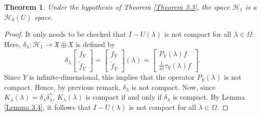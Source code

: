 \documentclass [12pt,reqno]{amsart}
\numberwithin{equation}{subsection}
\newtheorem{thm}{Theorem}[section]
\numberwithin{equation}{section}
\begin{document}
\begin{thm}\label{Theorem 3.6}
Under the hypothesis of Theorem \ref{Theorem 3.3}, the space \( \mathcal{H}_1 \) is a \( \mathcal{H}_0 (U) \) space.
\end{thm}
\begin{proof}
It only needs to be checked that \( I - U(\lambda) \) is not compact for all \( \lambda \in \Omega \). Here, \( \delta_{\lambda}: \mathcal{H}_1 \rightarrow \mathfrak{X} \oplus \mathfrak{X} \) is defined by
\[
\delta_{\lambda}\begin{bmatrix} 
f_Y  \\
\tilde{f}_Y
\end{bmatrix}
= \begin{bmatrix} 
f_Y  \\
\tilde{f}_Y
\end{bmatrix}(\lambda)
= \begin{bmatrix} 
P_{Y}(\lambda) f  \\
\frac{1}{\pi i} \tau_{Y}(\lambda) f
\end{bmatrix}.
\]
Since \( Y \) is infinite-dimensional, this implies that the operator \( P_{Y}(\lambda) \) is not compact. Hence, by previous remark, \( \delta_{\lambda} \) is not compact. Now, since \( K_{\lambda}(\lambda) = \delta_{\lambda} \delta_{\lambda}^* \), \( K_{\lambda}(\lambda) \) is compact if and only if \( \delta_{\lambda} \) is compact. By Lemma \ref{Lemma 3.4}, it follows that \( I - U(\lambda) \) is not compact for all \( \lambda \in \Omega \).
\end{proof}
\end{document}
